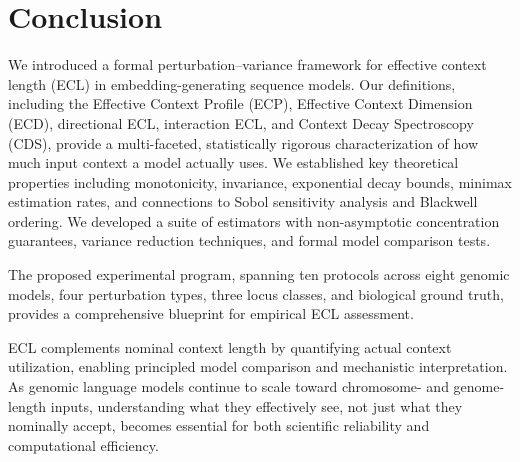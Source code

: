 \section{Conclusion}\label{sec:conclusion}

We introduced a formal perturbation--variance framework for effective context length (ECL) in embedding-generating sequence models. Our definitions, including the Effective Context Profile (ECP), Effective Context Dimension (ECD), directional ECL, interaction ECL, and Context Decay Spectroscopy (CDS), provide a multi-faceted, statistically rigorous characterization of how much input context a model actually uses. We established key theoretical properties including monotonicity, invariance, exponential decay bounds, minimax estimation rates, and connections to Sobol sensitivity analysis and Blackwell ordering. We developed a suite of estimators with non-asymptotic concentration guarantees, variance reduction techniques, and formal model comparison tests.

The proposed experimental program, spanning ten protocols across eight genomic models, four perturbation types, three locus classes, and biological ground truth, provides a comprehensive blueprint for empirical ECL assessment.

ECL complements nominal context length by quantifying actual context utilization, enabling principled model comparison and mechanistic interpretation. As genomic language models continue to scale toward chromosome- and genome-length inputs, understanding what they effectively see, not just what they nominally accept, becomes essential for both scientific reliability and computational efficiency.
